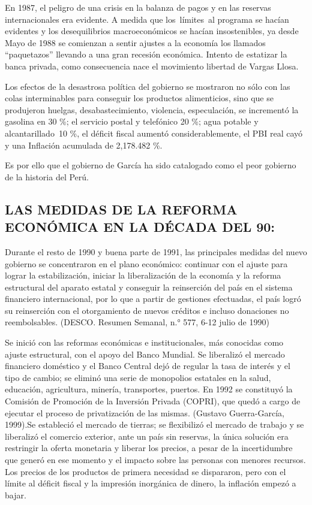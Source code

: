 \documentclass[
  letterpaper,
  DIV=11,
  numbers=noendperiod]{scrartcl}
\begin{document}
En 1987, el peligro de una crisis en la balanza de pagos y en las
reservas internacionales era evidente. A medida que los~límites~al
programa se hacían evidentes y los desequilibrios macroeconómicos se
hacían insostenibles, ya desde Mayo de 1988 se comienzan a sentir
ajustes a la economía los llamados ``paquetazos'' llevando a una gran
recesión económica. Intento de estatizar la banca privada, como
consecuencia nace el movimiento libertad de Vargas Llosa.

Los efectos de la desastrosa política del gobierno se mostraron no sólo
con las colas interminables para conseguir los productos alimenticios,
sino que se produjeron huelgas, desabastecimiento, violencia,
especulación, se incrementó la gasolina en 30 \%; el servicio postal y
telefónico 20 \%; agua potable y alcantarillado~10 \%, el déficit fiscal
aumentó considerablemente, el PBI real cayó y una Inflación acumulada de
2,178.482 \%.

Es por ello que el gobierno de García ha sido catalogado como el peor
gobierno de la historia del Perú.

\hypertarget{las-medidas-de-la-reforma-econuxf3mica-en-la-duxe9cada-del-90}{%
\subsection{LAS MEDIDAS DE LA REFORMA ECONÓMICA EN LA DÉCADA DEL
90:}\label{las-medidas-de-la-reforma-econuxf3mica-en-la-duxe9cada-del-90}}

Durante el resto de 1990 y buena parte de 1991, las principales medidas
del nuevo gobierno se concentraron en el plano económico: continuar con
el ajuste para lograr la estabilización, iniciar la liberalización de la
economía y la reforma estructural del aparato estatal y conseguir la
reinserción del país en el sistema financiero internacional, por lo que
a partir de gestiones efectuadas, el país logró su reinserción con el
otorgamiento de nuevos créditos e incluso donaciones no reembolsables.
(DESCO. Resumen Semanal, n.° 577, 6-12 julio de 1990)

Se inició con las reformas económicas e institucionales, más conocidas
como ajuste estructural, con el apoyo del Banco Mundial. Se liberalizó
el mercado financiero doméstico y el Banco Central dejó de regular la
tasa de interés y el tipo de cambio; se eliminó una serie de monopolios
estatales en la salud, educación, agricultura, minería, transportes,
puertos. En 1992 se constituyó la Comisión de Promoción de la Inversión
Privada (COPRI), que quedó a cargo de ejecutar el proceso de
privatización de las mismas. (Gustavo Guerra-García, 1999).Se estableció
el mercado de tierras; se flexibilizó el mercado de trabajo y se
liberalizó el comercio exterior, ante un país sin reservas, la única
solución era restringir la oferta monetaria y liberar los precios, a
pesar de la incertidumbre que generó en ese momento y el impacto sobre
las personas con menores recursos. Los precios de los productos de
primera necesidad se dispararon, pero con el límite al déficit fiscal y
la impresión inorgánica de dinero, la inflación empezó a bajar.
\end{document}
